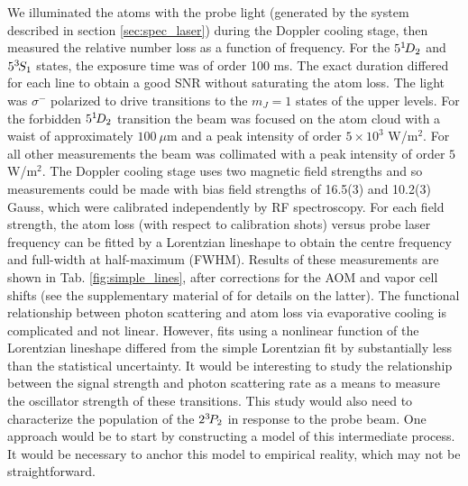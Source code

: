 

	

	We illuminated the atoms with the probe light (generated by the system described in section \ref{sec:spec_laser}) during the Doppler cooling stage, then measured the relative number loss as a function of frequency.
	For the $5^{1\!} D_2$ and $5^{3\!} S_1$ states, the exposure time was of order 100 ms. 
	The exact duration differed for each line to obtain a good SNR without saturating the atom loss.
	The light was $\sigma^-$ polarized to drive transitions to the $m_J=1$ states of the upper levels.
	For the forbidden $5^{1\!} D_2$ transition the beam was focused on the atom cloud with a waist of approximately $100~\mu$m and a peak intensity of order $5\times 10^3$ W/m$^2$.
	For all other measurements the beam was collimated with a peak intensity of order $ 5$ W/m$^2$.
	The Doppler cooling stage uses two magnetic field strengths and so measurements could be made with bias field strengths of {16.5(3)} and {10.2(3)} Gauss, which were calibrated independently by RF spectroscopy.
	For each field strength, the atom loss (with respect to calibration shots) versus probe laser frequency can be fitted by a Lorentzian lineshape to obtain the centre frequency and full-width at half-maximum (FWHM).
	Results of these measurements are shown in Tab.	\ref{fig:simple_lines}, after corrections for the AOM and vapor cell shifts (see the supplementary material of \cite{Thomas20} for details on the latter).
	The functional relationship between photon scattering and atom loss via evaporative cooling is complicated and not linear. 
	However, fits using a nonlinear function of the Lorentzian lineshape differed from the simple Lorentzian fit by substantially less than the statistical uncertainty.
	It would be interesting to study the relationship between the signal strength and photon scattering rate as a means to measure the oscillator strength of these transitions.
	This study would also need to characterize the population of the $2^{3\!} P_2$ in response to the probe beam. One approach would be to start by constructing a model of this intermediate process. It would be necessary to anchor this model to empirical reality, which may not be straightforward.

